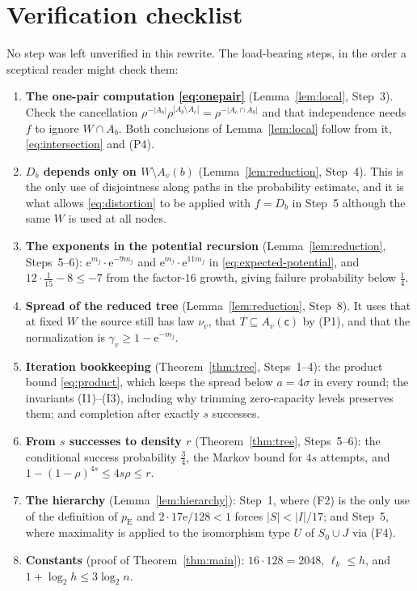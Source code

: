 \documentclass[11pt]{article}
\numberwithin{equation}{section}
\newcommand{\pE}{p_{\mathrm E}}
\newcommand{\ee}{\mathrm e}
\newcommand{\src}{\mathsf c}
\begin{document}
\section{Verification checklist}

No step was left unverified in this rewrite. The load-bearing steps, in
the order a sceptical reader might check them:

\begin{enumerate}[leftmargin=2em,itemsep=3pt]
 \item \textbf{The one-pair computation \eqref{eq:onepair}}
 (Lemma~\ref{lem:local}, Step~3). Check the cancellation
 $\rho^{-|A_b|}\rho^{|A_b\setminus A_c|}=\rho^{-|A_c\cap A_b|}$ and that
 independence needs $f$ to ignore $W\cap A_b$. Both conclusions of
 Lemma~\ref{lem:local} follow from it, \eqref{eq:intersection} and
 (P4).
 \item \textbf{$D_b$ depends only on $W\setminus A_v(b)$}
 (Lemma~\ref{lem:reduction}, Step~4). This is the only use of
 disjointness along paths in the probability estimate, and it is what
 allows \eqref{eq:distortion} to be applied with $f=D_b$ in Step~5
 although the same $W$ is used at all nodes.
 \item \textbf{The exponents in the potential recursion}
 (Lemma~\ref{lem:reduction}, Steps~5--6):
 $\ee^{m_j}\cdot\ee^{-9m_j}$ and $\ee^{m_j}\cdot\ee^{11m_j}$ in
 \eqref{eq:expected-potential}, and $12\cdot\frac1{15}-8\le-7$ from the
 factor-$16$ growth, giving failure probability below $\frac14$.
 \item \textbf{Spread of the reduced tree}
 (Lemma~\ref{lem:reduction}, Step~8). It uses that at fixed $W$ the
 source still has law $\nu_v$, that $T\subseteq A_v(\src)$ by (P1), and
 that the normalization is $\gamma_v\ge1-\ee^{-m_j}$.
 \item \textbf{Iteration bookkeeping} (Theorem~\ref{thm:tree},
 Steps~1--4): the product bound \eqref{eq:product}, which keeps the
 spread below $a=4\sigma$ in every round; the invariants (I1)--(I3),
 including why trimming zero-capacity levels preserves them; and
 completion after exactly $s$ successes.
 \item \textbf{From $s$ successes to density $r$}
 (Theorem~\ref{thm:tree}, Steps~5--6): the conditional success
 probability $\frac34$, the Markov bound for $4s$ attempts, and
 $1-(1-\rho)^{4s}\le4s\rho\le r$.
 \item \textbf{The hierarchy} (Lemma~\ref{lem:hierarchy}): Step~1,
 where (F2) is the only use of the definition of $\pE$ and
 $2\cdot17\ee/128<1$ forces $|S|<|I|/17$; and Step~5, where maximality
 is applied to the isomorphism type $U$ of $S_0\cup J$ via (F4).
 \item \textbf{Constants} (proof of Theorem~\ref{thm:main}):
 $16\cdot128=2048$, $\ell_k\le h$, and $1+\log_2h\le3\log_2n$.
\end{enumerate}
\end{document}
